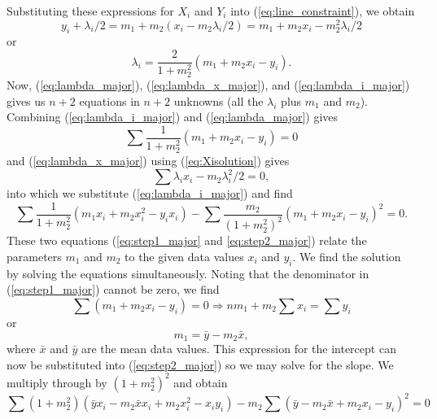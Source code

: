 Substituting these expressions for $X_i$ and $Y_i$ into (\ref{eq:line_constraint}), we obtain
\begin{equation}
y_i + \lambda_i/2 = m_1 + m_2 \left (x_i - m_2 \lambda_i/2 \right ) = m_1 + m_2 x_i - m_2^2 \lambda_i/2
\end{equation}	 
or
\begin{equation}
\lambda_i = \frac{2}{1 + m_2^2}\left (m_1 + m_2 x_i - y_i\right ).
\label{eq:lambda_i_major}
\end{equation}
Now, (\ref{eq:lambda_major}), (\ref{eq:lambda_x_major}), and (\ref{eq:lambda_i_major}) gives us
$n+2$ equations in $n+2$ unknowns (all the $\lambda_i$ plus $m_1$ and $m_2$).  Combining 
(\ref{eq:lambda_i_major}) and (\ref{eq:lambda_major}) gives
\begin{equation}
\sum	  \frac{1}{1+m_2^2} \left ( m_1 + m_2 x_i - y_i\right ) =  0
\label{eq:step1_major}
\end{equation}	
and (\ref{eq:lambda_x_major}) using (\ref{eq:Xisolution}) gives
\begin{equation}
\sum \lambda_i x_i - m_2\lambda ^2_i/2 = 0,
\end{equation}	 
into which we substitute (\ref{eq:lambda_i_major}) and find
\begin{equation}
\sum \frac{1}{1 + m_2^2}\left (m_1 x_i + m_2x^2_i - y_i x_i\right ) - \sum \frac{m_2}{(1+m_2^2)^2}\left (m_1 + m_2 x_i - y_i\right ) ^2 = 0.
\label{eq:step2_major} 
\end{equation}
These two equations (\ref{eq:step1_major} and \ref{eq:step2_major}) relate the parameters $m_1$ and $m_2$ to the given data values $x_i$ and $y_i$.  We find 
the solution by solving the equations simultaneously.  Noting that the denominator in (\ref{eq:step1_major}) cannot be zero, we find
\begin{equation}
\sum (m_1 + m_2 x_i - y_i) = 0 \Rightarrow n m_1 + m_2 \sum x_i = \sum y_i
\end{equation}	 
or
\begin{equation}
m_1 = \bar{y} - m_2 \bar{x},
\end{equation}
where $\bar{x}$  and $\bar{y}$ are the mean data values.  This expression for the intercept can now be substituted into 
(\ref{eq:step2_major}) so we may solve for the slope.  We multiply through by $(1 + m_2^2)^2$ and obtain
\begin{equation}
\sum (1 + m_2^2) \left ( \bar{y}x_i - m_2 \bar{x} x_i + m_2 x^2_i - x_i y_i \right ) - m_2 \sum  \left ( \bar{y} - m_2 \bar{x} + m_2 x_i - y_i\right ) ^2 = 0
\end{equation}

